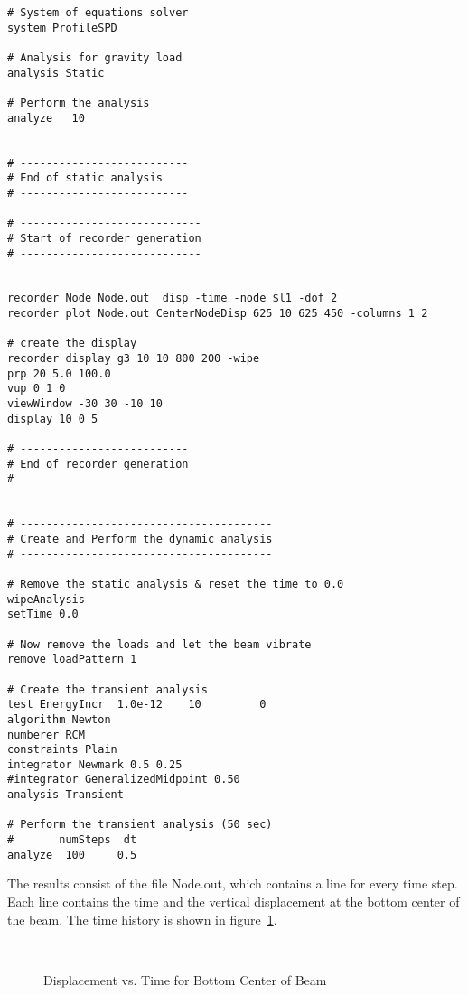 \documentclass[12pt]{article}
\begin{document}
{\begin{verbatim}
# System of equations solver
system ProfileSPD

# Analysis for gravity load
analysis Static

# Perform the analysis
analyze   10     


# --------------------------
# End of static analysis
# --------------------------

# ----------------------------
# Start of recorder generation
# ----------------------------


recorder Node Node.out  disp -time -node $l1 -dof 2
recorder plot Node.out CenterNodeDisp 625 10 625 450 -columns 1 2

# create the display
recorder display g3 10 10 800 200 -wipe
prp 20 5.0 100.0
vup 0 1 0
viewWindow -30 30 -10 10
display 10 0 5

# --------------------------
# End of recorder generation
# --------------------------


# ---------------------------------------
# Create and Perform the dynamic analysis
# ---------------------------------------

# Remove the static analysis & reset the time to 0.0
wipeAnalysis
setTime 0.0

# Now remove the loads and let the beam vibrate
remove loadPattern 1

# Create the transient analysis
test EnergyIncr  1.0e-12    10         0
algorithm Newton
numberer RCM
constraints Plain 
integrator Newmark 0.5 0.25
#integrator GeneralizedMidpoint 0.50
analysis Transient

# Perform the transient analysis (50 sec)
#       numSteps  dt
analyze  100     0.5

\end{verbatim}
}

\vspace{0.2in} 

The results consist of the file Node.out, which contains a line for
every time step. 
Each line contains the time and the vertical
displacement 
at the bottom center of the beam.
The time history is shown in
figure~\ref{beamdisp}. 
\begin{figure}[h]
\begin{center}
\leavevmode
\hbox{%
\epsfxsize=4.0in
\epsfysize=2.8in
}
\end{center}
\caption{Displacement vs. Time for Bottom Center of Beam}
\label{beamdisp}
\end{figure}
\end{document}

